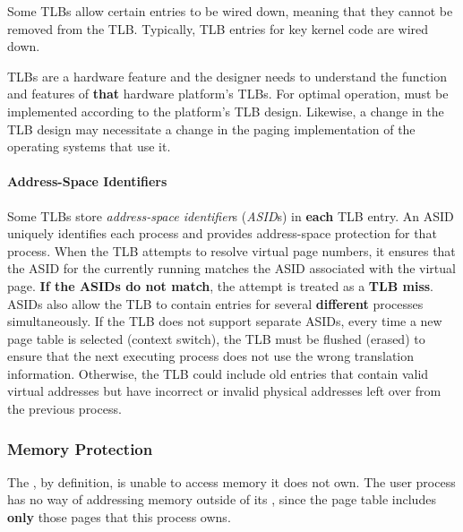 Some TLBs allow certain entries to be wired down, meaning that they cannot be removed from the TLB.\@
Typically, TLB entries for key kernel code are wired down.

TLBs are a hardware feature and the  designer needs to understand the function and features of \textbf{that} hardware platform's TLBs.
For optimal operation,  must be implemented according to the platform’s TLB design.
Likewise, a change in the TLB design may necessitate a change in the paging implementation of the operating systems that use it.

\paragraph{Address-Space Identifiers}\label{par:Address_Space_Identifiers}
Some TLBs store \emph{address-space identifier}s (\emph{ASID}s) in \textbf{each} TLB entry.
An ASID uniquely identifies each process and provides address-space protection for that process.
When the TLB attempts to resolve virtual page numbers, it ensures that the ASID for the currently running  matches the ASID associated with the virtual page.
\textbf{If the ASIDs do not match}, the attempt is treated as a \textbf{TLB miss}.
ASIDs also allow the TLB to contain entries for several \textbf{different} processes simultaneously.
If the TLB does not support separate ASIDs, every time a new page table is selected (context switch), the TLB must be flushed (erased) to ensure that the next executing process does not use the wrong translation information.
Otherwise, the TLB could include old entries that contain valid virtual addresses but have incorrect or invalid physical addresses left over from the previous process.

\subsubsection{Memory Protection}\label{subsubsec:Paging_Memory_Protection}
The  , by definition, is unable to access memory it does not own.
The user process has no way of addressing memory outside of its , since the page table includes \textbf{only} those pages that this process owns.
